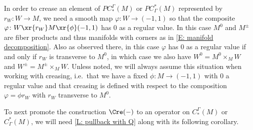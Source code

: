 \begin{convention}\label{C: regular value setup}
	In order to crease an element of $PC_*^\Gamma(M)$ or $PC^*_\Gamma(M)$ represented by $r_W \colon W \to M$, we need a smooth map $\varphi \colon W \to (-1,1)$ so that the composite $\varphi \colon W \xr{r_W}M \xr{\phi} (-1,1)$ has $0$ as a regular value.
	In this case $M^0$ and $M^\pm$ are fiber products and thus manifolds with corners as in \cref{E: manifold decomposition}.
	Also as observed there, in this case $\varphi$ has $0$ as a regular value if and only if $r_W$ is transverse to $M^0$, in which case we also have $W^0 = M^0 \times_M W$ and $W^\pm = M^\pm \times_M W$.
	Unless noted, we will always assume this situation when working with creasing, i.e.\ that we have a fixed $\phi \colon M \to (-1,1)$ with $0$ a regular value and that creasing is defined with respect to the composition $\varphi = \phi r_W$ with $r_W$ transverse to $M^0$.
\end{convention}

To next promote the construction $\Cre(-)$ to an operator on $C_*^{\Gamma}(M)$ or $C^*_\Gamma(M)$, we will need \cref{L: pullback with Q} along with its following corollary.

